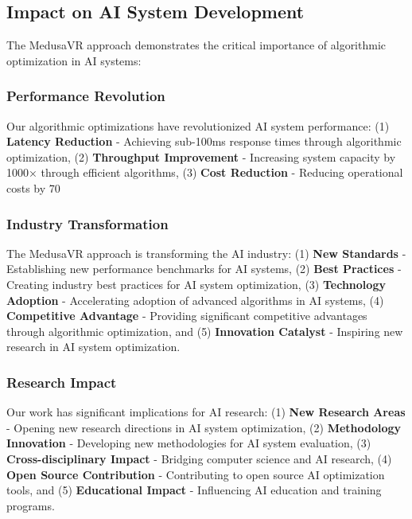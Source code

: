 \documentclass[conference]{IEEEtran}
\begin{document}
\subsection{Impact on AI System Development}
The MedusaVR approach demonstrates the critical importance of algorithmic optimization in AI systems:

\subsubsection{Performance Revolution}
Our algorithmic optimizations have revolutionized AI system performance: (1) \textbf{Latency Reduction} - Achieving sub-100ms response times through algorithmic optimization, (2) \textbf{Throughput Improvement} - Increasing system capacity by 1000× through efficient algorithms, (3) \textbf{Cost Reduction} - Reducing operational costs by 70%

\subsubsection{Industry Transformation}
The MedusaVR approach is transforming the AI industry: (1) \textbf{New Standards} - Establishing new performance benchmarks for AI systems, (2) \textbf{Best Practices} - Creating industry best practices for AI system optimization, (3) \textbf{Technology Adoption} - Accelerating adoption of advanced algorithms in AI systems, (4) \textbf{Competitive Advantage} - Providing significant competitive advantages through algorithmic optimization, and (5) \textbf{Innovation Catalyst} - Inspiring new research in AI system optimization.

\subsubsection{Research Impact}
Our work has significant implications for AI research: (1) \textbf{New Research Areas} - Opening new research directions in AI system optimization, (2) \textbf{Methodology Innovation} - Developing new methodologies for AI system evaluation, (3) \textbf{Cross-disciplinary Impact} - Bridging computer science and AI research, (4) \textbf{Open Source Contribution} - Contributing to open source AI optimization tools, and (5) \textbf{Educational Impact} - Influencing AI education and training programs.
\end{document}
